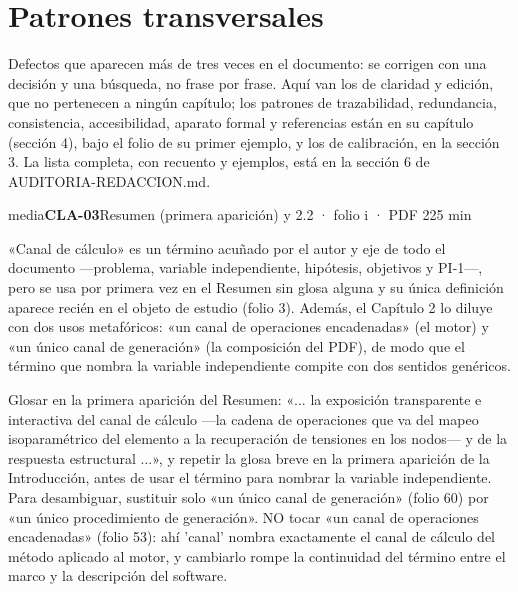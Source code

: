 \section{Patrones transversales}
Defectos que aparecen más de tres veces en el documento: se corrigen con una decisión y una búsqueda, no frase por frase. Aquí van los de claridad y edición, que no pertenecen a ningún capítulo; los patrones de trazabilidad, redundancia, consistencia, accesibilidad, aparato formal y referencias están en su capítulo (sección 4), bajo el folio de su primer ejemplo, y los de calibración, en la sección 3. La lista completa, con recuento y ejemplos, está en la sección 6 de AUDITORIA-REDACCION.md.
\begin{ficha}{media}{\casilla\textbf{CLA-03}\quad{}\quad Resumen (primera aparición) y 2.2 · folio i · PDF 2\hfill 25 min}
\par
{}«Canal de cálculo» es un término acuñado por el autor y eje de todo el documento —problema, variable independiente, hipótesis, objetivos y PI-1—, pero se usa por primera vez en el Resumen sin glosa alguna y su única definición aparece recién en el objeto de estudio (folio 3). Además, el Capítulo 2 lo diluye con dos usos metafóricos: «un canal de operaciones encadenadas» (el motor) y «un único canal de generación» (la composición del PDF), de modo que el término que nombra la variable independiente compite con dos sentidos genéricos.\par
{}Glosar en la primera aparición del Resumen: «... la exposición transparente e interactiva del canal de cálculo —la cadena de operaciones que va del mapeo isoparamétrico del elemento a la recuperación de tensiones en los nodos— y de la respuesta estructural ...», y repetir la glosa breve en la primera aparición de la Introducción, antes de usar el término para nombrar la variable independiente. Para desambiguar, sustituir solo «un único canal de generación» (folio 60) por «un único procedimiento de generación». NO tocar «un canal de operaciones encadenadas» (folio 53): ahí 'canal' nombra exactamente el canal de cálculo del método aplicado al motor, y cambiarlo rompe la continuidad del término entre el marco y la descripción del software.\par

\end{ficha}
